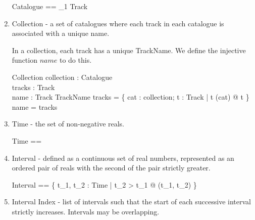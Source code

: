 \documentclass[11pt]{article}
\begin{document}
\begin{enumerate}
\begin{zed}
	Catalogue  == \seq_1 Track 
\end{zed}

\item \textsf{Collection} - a set of catalogues where each track in each catalogue is associated with a unique name.

In a collection, each track has a unique \textsf{TrackName}. We define the injective function $name$ to do this. 

\begin{zed}
	[TrackName]
\end{zed}

\begin{schema}{Collection}
	collection : \power Catalogue 		\\
	tracks : \power Track 			\\
	name : Track \inj TrackName 
\where
	tracks = \{ cat : collection; t : Track | t \in (\ran cat) @ t \}  \\
	\dom name = tracks
\end{schema}

\item \textsf{Time} - the set of non-negative reals. 


\begin{zed}
	Time == \R
\end{zed}


\item \textsf{Interval} - defined as a continuous set of real numbers,  represented as an ordered pair of reals with the second of the pair strictly greater.  

\begin{flushright}
\end{flushright}

\begin{zed}
	Interval == \{ t_1, t_2 : Time | t_2 > t_1 @ (t_1, t_2) \} 
\end{zed}

\item \textsf{Interval Index} - list of intervals such that the start of each successive interval strictly increases.  Intervals may be overlapping. 


\end{enumerate}
\end{document}
